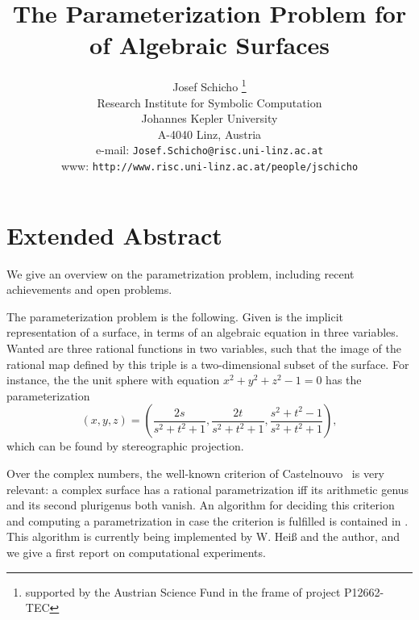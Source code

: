 
\title{The Parameterization Problem for of Algebraic Surfaces}
\author{Josef Schicho%
        \thanks{supported by the Austrian Science Fund in the
                frame of project P12662-TEC} \\
        Research Institute for Symbolic Computation \\
        Johannes Kepler University \\
        A-4040 Linz, Austria \\
        e-mail: {\tt Josef.Schicho@risc.uni-linz.ac.at} \\
        www: {\tt http://www.risc.uni-linz.ac.at/people/jschicho}}
\newtheorem{thm}{Theorem}
\newtheorem{prop}{Proposition}
\newtheorem{cor}{Corollary}
\newtheorem{lemma}{Lemma}
\newtheorem{rem}{Remark}
\newtheorem{example}{Example}
\newtheorem{definition}{Definition}

\maketitle

\section{Extended Abstract}

We give an overview on the parametrization problem, including recent
achievements and open problems.

The parameterization problem is the following. Given is the implicit
representation of a surface, in terms of an algebraic equation
in three variables.
Wanted are three rational functions in two variables,
such that the image of the rational map defined by
this triple is a two-dimensional subset of the surface.
For instance, the the unit sphere
with equation $x^2+y^2+z^2-1=0$
has the parameterization
\[ (x,y,z) =
  (\frac{2s}{s^2+t^2+1},\frac{2t}{s^2+t^2+1},\frac{s^2+t^2-1}{s^2+t^2+1}) , \]
which can be found by stereographic projection.

Over the complex numbers, the well-known criterion of
Castelnouvo~\cite{Castelnuovo:96} is very relevant: a complex
surface has a rational parametrization iff its arithmetic genus
and its second plurigenus both vanish. An algorithm for deciding
this criterion and computing a parametrization in case the criterion
is fulfilled is contained in \cite{Schicho:97}. This algorithm
is currently being implemented by W. Hei{\ss} and the author,
and we give a first report on computational experiments.

